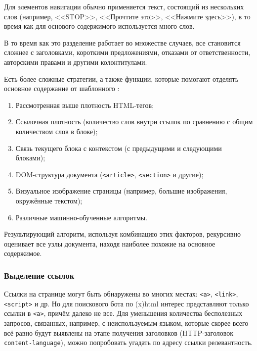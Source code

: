 Для элементов навигации обычно применяется текст, состоящий из нескольких слов (например, <<STOP>>, <<Прочтите это>>, <<Нажмите здесь>>), в то время как для основого содержимого используется много слов.

В то время как это разделение работает во множестве случаев, все становится сложнее с заголовками, короткими предложениями, отказами от ответственности, авторскими правами и другими колонтитулами.

Есть более сложные стратегии, а также функции, которые помогают отделять основное содержание от шаблонного \cite{kohlschutter10}:
\begin{enumerate}
  \item Рассмотренная выше плотность HTML-тегов;
  \item Ссылочная плотность (количество слов внутри ссылок по сравнению с общим количеством слов в блоке);
  \item Связь текущего блока с контекстом (с предыдущими и следующими блоками);
  \item DOM-структура документа (\verb|<article>|, \verb|<section>| и другие);
  \item Визуальное изображение страницы (например, большие изображения, окружённые текстом);
  \item Различные машинно-обученные алгоритмы.
\end{enumerate}

Результирующий алгоритм, используя комбинацию этих факторов, рекурсивно оценивает все узлы документа, находя наиболее похожие на основное содержимое.


\subsubsection{Выделение ссылок} \label{sssec:links}
Ссылки на странице могут быть обнаружены во многих местах: \verb|<a>|, \verb|<link>|, \verb|<script>| и др. Но для поискового бота по (x)html интерес представляют только ссылки в \verb|<a>|, причём далеко не все. Для уменьшения количества бесполезных запросов, связанных, например, с неиспользуемым языком, которые скорее всего всё равно будут выявлены на этапе получения заголовков (HTTP-заголовок \verb|content-language|), можно попробовать угадать по адресу ссылки релевантность.

